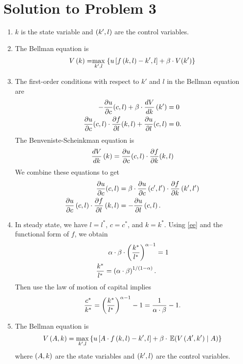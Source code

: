 \documentclass[letterpaper,12pt,leqno]{article}
\begin{document}
\section*{Solution to Problem 3}

\begin{enumerate}
\item $k$ is the state variable and $\left( k',l \right) $ are the control variables.
\item The Bellman equation is 
\begin{align*}
V\bp{k} =\underset{k',l}{\max}\bc{u\bs{f\bp{k,l} -k',l} +\b\cdot  V(k')}
\end{align*}
\item The first-order conditions with respect to $k'$ and $l$ in the Bellman equation are
\begin{align*}
-\frac{\partial u}{\partial c}(c,l)+\beta \cdot \frac{d V}{d k}\left( k' \right)& =0 \\
\frac{\partial u}{\partial c}(c,l)\cdot \frac{\partial f}{\partial l}(k,l)+\frac{\partial u}{\partial l}(c,l)&=0 .
\end{align*}
The Benveniste-Scheinkman equation is
\begin{align*}
\frac{d V}{d k}\left( k \right) =\frac{\partial u}{\partial c}(c,l)\cdot \frac{\partial f}{\partial k}(k,l)
\end{align*}
We combine these equations to get
\begin{align}
\frac{\partial u}{\partial c}(c,l) &=\beta \cdot \frac{\partial u}{\partial c}\left( c',l' \right) \cdot \frac{\partial f}{\partial  k}\left( k',l' \right)\label{ee} \\
\frac{\partial u}{\partial c}\left( c,l \right)\cdot \frac{\partial f}{\partial l}\left( k,l \right)&=-\frac{\partial u}{\partial l}\left( c,l \right).
\end{align}

\item In steady state, we have $l=l^{*}$, $c=c^{*}$, and $k=k^{*}$. Using \eqref{ee} and the functional form of $f$, we obtain
\begin{align*}
\alpha \cdot \beta\cdot  \left( \frac{k^{*}}{l^{*}} \right)^{\alpha-1}&=1\\
\frac{k^{*}}{l^{*}}=\left( \alpha\cdot  \beta \right)^{1/\left( 1-\alpha \right)}.
\end{align*}
Then use the law of motion of capital implies 
\begin{align*}
\frac{c^{*}}{k^{*}}=\left( \frac{k^{*}}{l^{*}} \right)^{\alpha-1}-1=\frac{1}{\alpha \cdot \beta}-1.
\end{align*}

\item The Bellman equation is 
\begin{align*}
V\bp{A,k} =\max_{k',l}\bc{u\bs{A\cdot f\bp{k,l}-k',l} +\b \cdot \E{ V\bp{A',k'}\mid A}}
\end{align*}
where $\left( A,k \right) $ are the state variables and $\left( k',l \right) $ are the control variables.


\end{enumerate}
\end{document}
